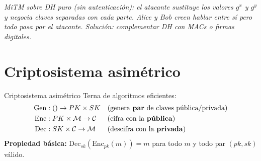 \documentclass[11pt,a4paper]{article}
\newcommand{\diagcaption}[1]{\begin{center}\small\textit{#1}\end{center}}
\begin{document}
\begin{center}
\end{center}
\diagcaption{MiTM sobre DH puro (sin autenticación): el atacante sustituye los
valores $g^x$ y $g^y$ y negocia claves separadas con cada parte. Alice y Bob creen
hablar entre sí pero todo pasa por el atacante. Solución: complementar DH con MACs
o firmas digitales.}

\section{Criptosistema asimétrico}

\begin{definicion}{Criptosistema asimétrico}
Terna de algoritmos eficientes:
\begin{align*}
\mathrm{Gen} &: () \to PK \times SK
  &&\text{(genera \textbf{par} de claves pública/privada)}\\
\mathrm{Enc} &: PK \times \mathcal{M} \to \mathcal{C}
  &&\text{(cifra con la \textbf{pública})}\\
\mathrm{Dec} &: SK \times \mathcal{C} \to \mathcal{M}
  &&\text{(descifra con la \textbf{privada})}
\end{align*}
\textbf{Propiedad básica:} $\mathrm{Dec}_{sk}(\mathrm{Enc}_{pk}(m)) = m$ para todo
$m$ y todo par $(pk, sk)$ válido.
\end{definicion}
\end{document}
